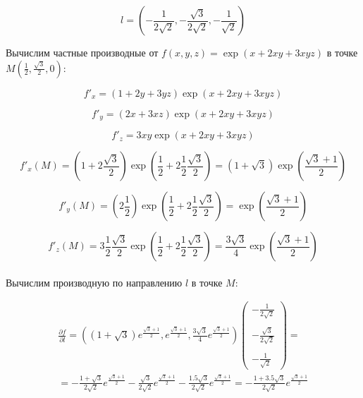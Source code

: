 \documentclass[a5paper, 10pt]{article}
\theoremstyle{definition}
\theoremstyle{plain}
\theoremstyle{remark}
\begin{document}
\begin{equation}
l = \left( -\frac{1}{2\sqrt{2}}, - \frac{\sqrt{3}}{2\sqrt{2}}, - \frac{1}{\sqrt{2}} \right)
\end{equation}

Вычислим частные производные от $f(x, y, z) = \exp(x + 2xy + 3xyz)$ в точке $M \left( \frac{1}{2}, \frac{\sqrt{3}}{2}, 0 \right)$:

\begin{equation}
f'_x = \left(1 + 2y + 3yz \right) \exp(x + 2xy + 3xyz)
\end{equation}

\begin{equation}
f'_y  = \left( 2x + 3xz \right) \exp(x + 2xy + 3xyz)
\end{equation}

\begin{equation}
f'_z   = 3xy \exp(x + 2xy + 3xyz)
\end{equation}

\begin{equation}
f'_x  \left( M \right) =  \left(1 + 2 \frac{\sqrt{3}}{2} \right) \exp \left( \frac{1}{2} + 2 \frac{1}{2}\frac{\sqrt{3}}{2} \right) =
\left(1 + \sqrt{3} \right) \exp \left( \frac{\sqrt{3} + 1}{2} \right) 
\end{equation}

\begin{equation}
f'_y  \left( M \right) =  \left( 2\frac{1}{2}  \right) \exp \left(\frac{1}{2} + 2\frac{1}{2}\frac{\sqrt{3}}{2} \right) =
\exp \left(\frac{\sqrt{3} + 1}{2} \right)
\end{equation}

\begin{equation}
f'_z  \left( M \right) = 3\frac{1}{2}\frac{\sqrt{3}}{2} \exp \left(\frac{1}{2} + 2\frac{1}{2}\frac{\sqrt{3}}{2} \right) =
\frac{3 \sqrt{3}}{4} \exp \left(\frac{\sqrt{3} + 1}{2} \right)
\end{equation}
\\
Вычислим производную по направлению $l$ в точке $M$:

\begin{multline}
\frac{\partial f}{\partial l} = \left(\left(1 + \sqrt{3} \right) e^{ \frac{\sqrt{3} + 1}{2}} , e^{ \frac{\sqrt{3} + 1}{2}}, \frac{3 \sqrt{3}}{4} e^{ \frac{\sqrt{3} + 1}{2}  } \right)
\begin{pmatrix}
 -\frac{1}{2\sqrt{2}}\\
\\
- \frac{\sqrt{3}}{2\sqrt{2}}\\
\\
- \frac{1}{\sqrt{2}}
\end{pmatrix}
= \\
=   -\frac{1 + \sqrt{3}}{2\sqrt{2}} e^{ \frac{\sqrt{3} + 1}{2}} - \frac{\sqrt{3}}{2\sqrt{2}}  e^{ \frac{\sqrt{3} + 1}{2}}
 - \frac{1.5 \sqrt{3}}{2\sqrt{2}}  e^{ \frac{\sqrt{3} + 1}{2}}  =  - \frac{1 + 3.5 \sqrt{3}}{2\sqrt{2}}  e^{ \frac{\sqrt{3} + 1}{2}} 
\end{multline}
\end{document}

